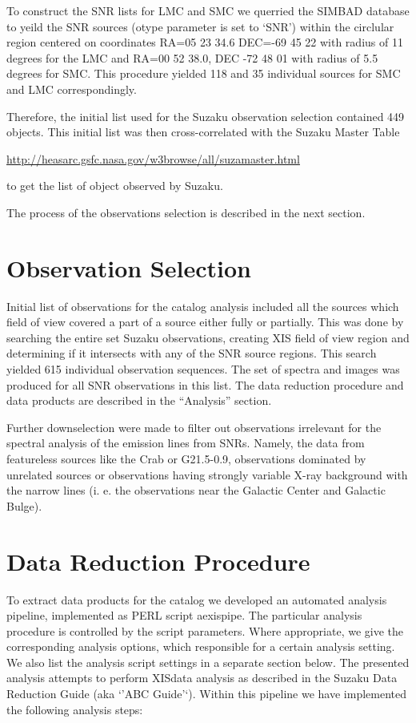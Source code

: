 \documentclass[letterpaper,10pt,english]{sphinxmanual}
\begin{document}
To construct the SNR lists for LMC and SMC we querried the SIMBAD database
to yeild the SNR sources (otype parameter is set to `SNR') within the circlular
region centered on coordinates RA=05 23 34.6 DEC=-69 45 22 with radius of 11
degrees for  the LMC and RA=00 52 38.0, DEC -72 48 01 with radius of
5.5 degrees for SMC. This procedure yielded 118 and 35 individual
sources  for SMC and LMC correspondingly.

Therefore, the initial list used for the Suzaku observation selection contained
449 objects. This initial list was then cross-correlated with the Suzaku Master Table %
\begin{footnote}[3]\sphinxAtStartFootnote
\url{http://heasarc.gsfc.nasa.gov/w3browse/all/suzamaster.html}
%
\end{footnote}
to get the list of object observed by Suzaku.

The process of the observations selection is described
in the next section.


\chapter{Observation Selection}
\label{\detokenize{observations:observation-selection}}\label{\detokenize{observations::doc}}
Initial list of observations for the catalog analysis included all the sources
which field of view covered a part of a source either fully or partially.
This was done by searching the entire set Suzaku observations, creating
XIS field of view region and determining if it intersects with any of
the SNR source regions. This search yielded 615 individual observation sequences.
The set of spectra and images was produced for all SNR observations in this
list. The data reduction procedure and data products are described in the
``Analysis'' section.

Further downselection were made to filter out observations irrelevant
for the spectral analysis of the emission lines from SNRs.
Namely, the data from featureless
sources like the Crab or G21.5-0.9, observations dominated by unrelated
sources or observations having strongly variable X-ray background
with the narrow lines (i. e. the observations near the Galactic Center and
Galactic Bulge).


\chapter{Data Reduction Procedure}
\label{\detokenize{procedure:data-reduction-procedure}}\label{\detokenize{procedure::doc}}
To extract data products for the catalog we developed an automated analysis pipeline, implemented as PERL script aexispipe. The particular analysis procedure is controlled by the script parameters. Where appropriate, we give the corresponding analysis options, which responsible for a certain analysis setting. We also list the analysis script settings in a separate section below. The presented analysis attempts to perform XISdata analysis as described in the Suzaku Data Reduction Guide (aka `'ABC Guide'`). Within this pipeline we have implemented the following analysis steps:
\end{document}
